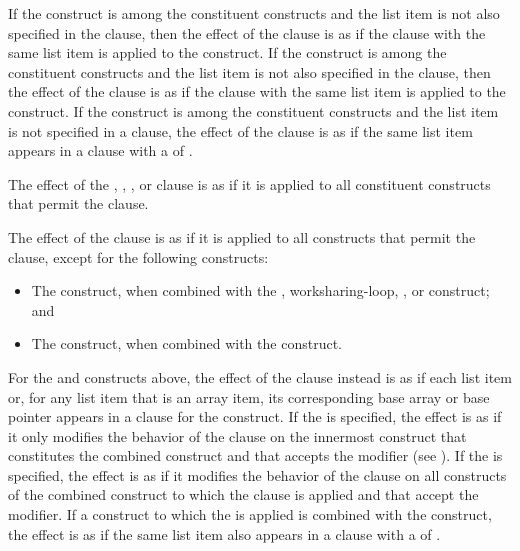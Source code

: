 If the  construct is among the constituent constructs and the
list item is not also specified in the  clause, then the 
effect of the  clause is as if the  clause 
with the same list item is applied to the  construct. If the 
 construct is among the constituent constructs and the list item 
is not also specified in the  clause, then the effect of the
 clause is as if the  clause with the same list 
item is applied to the  construct. If the  construct 
is among the constituent constructs and the list item is not specified in a 
 clause, the effect of the  clause is as if the same 
list item appears in a  clause with a  of .

The effect of the , , , or  
clause is as if it is applied to all constituent constructs that permit the clause.

The effect of the  clause is as if it is applied to all 
constructs that permit the clause, except for the following constructs:

\begin{itemize}
\item The  construct, when combined with the , worksharing-loop,
      , or  construct; and
\item The  construct,  when combined with the  construct.
\end{itemize}

For the  and  constructs above, the effect of the
 clause instead is as if each list item or, for any list item 
that is an array item, its corresponding base array or base pointer appears 
in a  clause for the construct. If the  
 is specified, the effect is as if it only modifies 
the behavior of the  clause on the innermost construct that 
constitutes the combined construct and that accepts the modifier (see 
). If the   
is specified, the effect is as if it modifies the behavior of the  
clause on all constructs  of the combined construct to which the clause is applied 
and that accept the modifier. If a construct to which the  
 is applied is combined with the  construct, 
the effect is as if the same list item also appears in a  clause with a 
 of .

